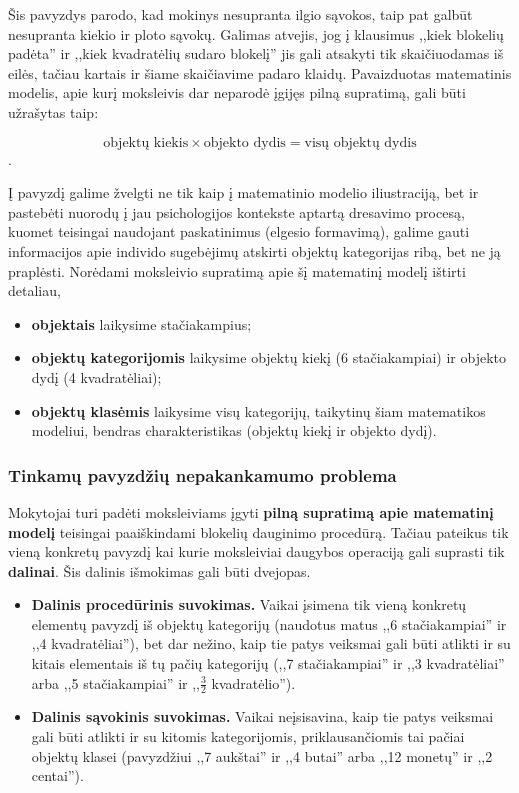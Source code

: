 \documentclass{article}
\begin{document}
Šis pavyzdys parodo, kad mokinys nesupranta ilgio sąvokos, taip pat galbūt nesupranta kiekio ir ploto sąvokų. Galimas atvejis, jog į klausimus ,,kiek blokelių padėta'' ir ,,kiek kvadratėlių sudaro blokelį'' jis gali atsakyti tik skaičiuodamas iš eilės, tačiau kartais ir šiame skaičiavime padaro klaidų. Pavaizduotas matematinis modelis, apie kurį moksleivis dar neparodė įgijęs pilną supratimą, gali būti užrašytas taip:

$$\text{objektų kiekis}\times\text{objekto dydis}=\text{visų objektų dydis}$$.

Į pavyzdį galime žvelgti ne tik kaip į matematinio modelio iliustraciją, bet ir pastebėti nuorodų į jau psichologijos kontekste aptartą dresavimo procesą, kuomet teisingai naudojant paskatinimus (elgesio formavimą), galime gauti informacijos apie individo sugebėjimų atskirti objektų kategorijas ribą, bet ne ją praplėsti. Norėdami moksleivio supratimą apie šį matematinį modelį ištirti detaliau,

\begin{itemize}
\item \textbf{objektais} laikysime stačiakampius;
\item \textbf{objektų kategorijomis} laikysime objektų kiekį (6 stačiakampiai) ir objekto dydį (4 kvadratėliai);
\item \textbf{objektų klasėmis} laikysime visų kategorijų, taikytinų šiam matematikos modeliui, bendras charakteristikas (objektų kiekį ir objekto dydį).
\end{itemize}

\subsubsection{Tinkamų pavyzdžių nepakankamumo problema}

Mokytojai turi padėti moksleiviams įgyti \textbf{pilną supratimą apie matematinį modelį} teisingai paaiškindami blokelių dauginimo procedūrą. Tačiau pateikus tik vieną konkretų pavyzdį kai kurie moksleiviai daugybos operaciją gali suprasti tik \textbf{dalinai}. Šis dalinis išmokimas gali būti dvejopas.
\begin{itemize}
\item \textbf{Dalinis procedūrinis suvokimas.} Vaikai įsimena tik vieną konkretų elementų pavyzdį iš objektų kategorijų (naudotus matus ,,6 stačiakampiai'' ir ,,4 kvadratėliai''), bet dar nežino, kaip tie patys veiksmai gali būti atlikti ir su kitais elementais iš tų pačių kategorijų (,,7 stačiakampiai'' ir ,,3 kvadratėliai'' arba ,,5 stačiakampiai'' ir ,,$\frac{3}{2}$ kvadratėlio'').
\item \textbf{Dalinis sąvokinis suvokimas.} Vaikai neįsisavina, kaip tie patys veiksmai gali būti atlikti ir su kitomis kategorijomis, priklausančiomis tai pačiai objektų klasei (pavyzdžiui ,,7 aukštai'' ir ,,4 butai'' arba ,,12 monetų'' ir ,,2 centai'').
\end{itemize}
 
\end{document}
